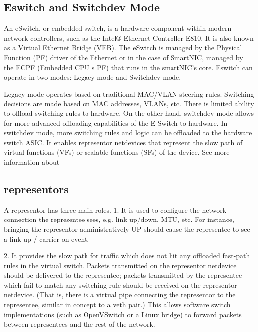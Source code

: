 \documentclass[letterpaper]{article}
\begin{document}
\subsection{Eswitch and Switchdev Mode}
An eSwitch, or embedded switch, is a hardware component within modern network
controllers, such as the Intel® Ethernet Controller E810. It is also known as
a Virtual Ethernet Bridge (VEB). The eSwitch is managed by the Physical Function (PF)
driver of the Ethernet or in the case of SmartNIC, managed by the ECPF (Embedded CPU
s PF) that runs in the smartNIC's core. Eswitch can operate in two modes:
Legacy mode and Switchdev mode. 

Legacy mode operates based on traditional MAC/VLAN steering rules. Switching
decisions are made based on MAC addresses, VLANs, etc. There is limited ability
to offload switching rules to hardware.
On the other hand, switchdev mode allows for more advanced offloading
capabilities of the E-Switch to hardware. In switchdev mode, more switching
rules and logic can be offloaded to the hardware switch ASIC. It enables
representor netdevices that represent the slow path of virtual functions (VFs)
or scalable-functions (SFs) of the device. See more information about

\subsection{representors}

A representor has three main roles.
1. It is used to configure the network connection the representee sees, e.g.
   link up/down, MTU, etc.  For instance, bringing the representor
administratively UP should cause the representee to see a link up / carrier
   on event.

2. It provides the slow path for traffic which does not hit any offloaded
   fast-path rules in the virtual switch.  Packets transmitted on the
   representor netdevice should be delivered to the representee; packets
  transmitted by the representee which fail to match any switching rule should
  be received on the representor netdevice.  (That is, there is a virtual pipe 
  connecting the representor to the representee, similar in concept to a veth
  pair.)
  This allows software switch implementations (such as OpenVSwitch or a Linux
   bridge) to forward packets between representees and the rest of the network.
   
\end{document}

